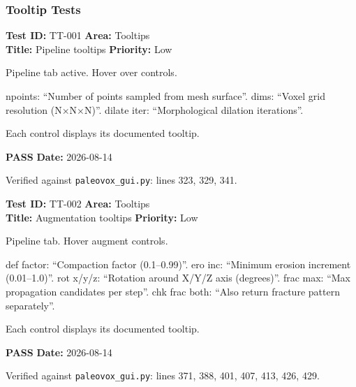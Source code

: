 \documentclass[12pt,a4paper]{article}
\newcommand{\pass}{\textcolor{paleogreen}{\textbf{PASS}}}
\newcommand{\testheader}[4]{%
  \smallskip
  \noindent\textbf{Test ID:} #1 \hfill \textbf{Area:} #2 \\
  \textbf{Title:} #3 \hfill \textbf{Priority:} #4
}
\newenvironment{testbody}{%
  \begin{description}[leftmargin=2em,style=nextline]
}{%
  \end{description}
  \smallskip
}
\begin{document}
\newpage

\subsubsection{Tooltip Tests}

\testheader{TT-001}{Tooltips}{Pipeline tooltips}{Low}
\begin{testbody}
  \item[\textbf{Preconditions:}] Pipeline tab active. Hover over controls.
  \item[\textbf{Steps:}] npoints: ``Number of points sampled from mesh
        surface''. dims: ``Voxel grid resolution (N$\times$N$\times$N)''.
        dilate iter: ``Morphological dilation iterations''.
  \item[\textbf{Expected Result:}] Each control displays its documented
        tooltip.
  \item[\textbf{Status:}] \pass{} \hspace{1em} \textbf{Date:} 2026-08-14
  \item[\textbf{Notes:}] Verified against \texttt{paleovox\_gui.py}: lines 323,
        329, 341.
\end{testbody}

\testheader{TT-002}{Tooltips}{Augmentation tooltips}{Low}
\begin{testbody}
  \item[\textbf{Preconditions:}] Pipeline tab. Hover augment controls.
  \item[\textbf{Steps:}] def factor: ``Compaction factor (0.1--0.99)''.
        ero inc: ``Minimum erosion increment (0.01--1.0)''. rot x/y/z:
        ``Rotation around X/Y/Z axis (degrees)''. frac max: ``Max propagation
        candidates per step''. chk frac both: ``Also return fracture pattern
        separately''.
  \item[\textbf{Expected Result:}] Each control displays its documented
        tooltip.
  \item[\textbf{Status:}] \pass{} \hspace{1em} \textbf{Date:} 2026-08-14
  \item[\textbf{Notes:}] Verified against \texttt{paleovox\_gui.py}: lines 371,
        388, 401, 407, 413, 426, 429.
\end{testbody}
\end{document}
